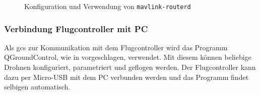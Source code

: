 \begin{figure}
  \centering
    
    
	\caption{Konfiguration und Verwendung von \texttt{mavlink-routerd}}
\label{fig:mav_controller}
\end{figure}

\subsubsection{Verbindung Flugcontroller mit PC}
Als \gls{gcs} zur Kommunikation mit dem Flugcontroller wird das Programm QGroundControl, wie in \cite[Kapitel 3.4]{wirthErweiterungBestehendenDrohne2022} vorgeschlagen, verwendet. Mit diesem können beliebige Drohnen konfiguriert, parametriert und geflogen werden. Der Flugcontroller kann dazu per Micro-USB mit dem PC verbunden werden und das Programm findet selbigen automatisch.

